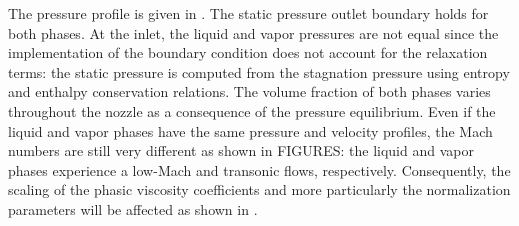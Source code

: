 \documentclass[preprint,10pt]{elsarticle}
\begin{document}
The pressure profile is given in . The static pressure outlet boundary holds for both phases. At the inlet, the liquid and vapor pressures are not equal since the implementation of the boundary condition does not account for the relaxation terms: the static pressure is computed from the stagnation pressure using entropy and enthalpy conservation relations. The volume fraction of both phases varies throughout the nozzle as a consequence of the pressure equilibrium. Even if the liquid and vapor phases have the same pressure and velocity profiles, the Mach numbers are still very different as shown in FIGURES: the liquid and vapor phases experience a low-Mach and transonic flows, respectively. Consequently, the scaling of the phasic viscosity coefficients and more particularly the normalization parameters will be affected as shown in .
%
\end{document}
